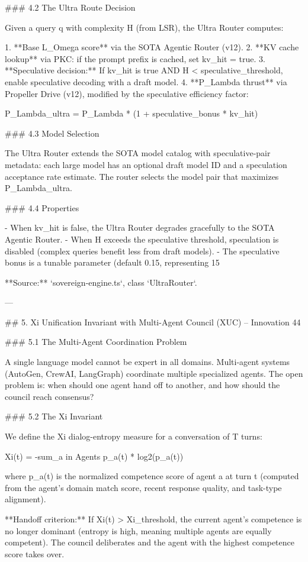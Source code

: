 ### 4.2 The Ultra Route Decision

Given a query q with complexity H (from LSR), the Ultra Router computes:

1. **Base L_Omega score** via the SOTA Agentic Router (v12).
2. **KV cache lookup** via PKC: if the prompt prefix is cached, set kv_hit = true.
3. **Speculative decision:** If kv_hit is true AND H < speculative_threshold, enable speculative decoding with a draft model.
4. **P_Lambda thrust** via Propeller Drive (v12), modified by the speculative efficiency factor:

P_Lambda_ultra = P_Lambda * (1 + speculative_bonus * kv_hit)

### 4.3 Model Selection

The Ultra Router extends the SOTA model catalog with speculative-pair metadata: each large model has an optional draft model ID and a speculation acceptance rate estimate. The router selects the model pair that maximizes P_Lambda_ultra.

### 4.4 Properties

- When kv_hit is false, the Ultra Router degrades gracefully to the SOTA Agentic Router.
- When H exceeds the speculative threshold, speculation is disabled (complex queries benefit less from draft models).
- The speculative bonus is a tunable parameter (default 0.15, representing 15%

**Source:** `sovereign-engine.ts`, class `UltraRouter`.

---

## 5. Xi Unification Invariant with Multi-Agent Council (XUC) -- Innovation 44

### 5.1 The Multi-Agent Coordination Problem

A single language model cannot be expert in all domains. Multi-agent systems (AutoGen, CrewAI, LangGraph) coordinate multiple specialized agents. The open problem is: when should one agent hand off to another, and how should the council reach consensus?

### 5.2 The Xi Invariant

We define the Xi dialog-entropy measure for a conversation of T turns:

Xi(t) = -sum_{a in Agents} p_a(t) * log2(p_a(t))

where p_a(t) is the normalized competence score of agent a at turn t (computed from the agent's domain match score, recent response quality, and task-type alignment).

**Handoff criterion:** If Xi(t) > Xi_threshold, the current agent's competence is no longer dominant (entropy is high, meaning multiple agents are equally competent). The council deliberates and the agent with the highest competence score takes over.

